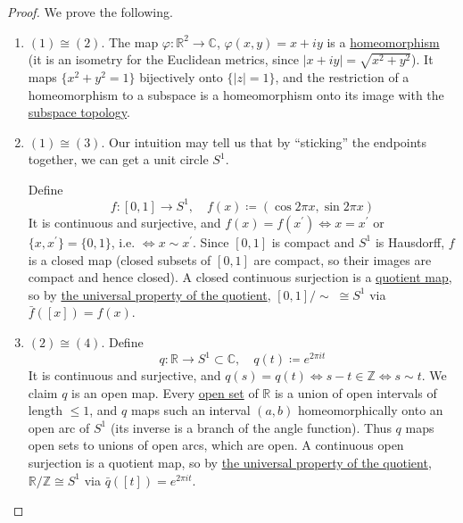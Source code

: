 	\begin{proof}
	  We prove the following. 
		\begin{enumerate}
		  \item $(1) \cong (2)$. The map $\varphi: \mathbb{R}^2 \rightarrow \mathbb{C}$, $\varphi(x, y) = x + iy$ is a \hyperref[def:homeomorphism]{homeomorphism} (it is an isometry for the Euclidean metrics, since $|x + iy| = \sqrt{x^2 + y^2}$). It maps $\{x^2 + y^2 = 1\}$ bijectively onto $\{|z| = 1\}$, and the restriction of a homeomorphism to a subspace is a homeomorphism onto its image with the \hyperref[def:subspace-topology]{subspace topology}. 

			\item $(1) \cong (3)$. Our intuition may tell us that by ``sticking'' the endpoints together, we can get a unit circle $S^1$. 

				Define 
				\begin{equation}
					f: [0, 1] \rightarrow S^1, \quad f(x) \coloneqq (\cos{2 \pi x}, \sin{2\pi x})
				\end{equation} 
				It is continuous and surjective, and $f(x) = f(x^\prime) \iff x = x^\prime$ or $\{x, x^\prime\} = \{0, 1\}$, i.e. $\iff x \sim x^\prime$. Since $[0, 1]$ is compact and $S^1$ is Hausdorff, $f$ is a closed map (closed subsets of $[0, 1]$ are compact, so their images are compact and hence closed). A closed continuous surjection is a \hyperref[def:quotient-map]{quotient map}, so by \hyperref[thm:quotient_homeomorphism]{the universal property of the quotient}, $[0, 1]/{\sim} \; \cong S^1$ via $\bar{f}([x]) = f(x)$. 

			\item $(2) \cong (4)$. Define 
				\begin{equation}
					q: \mathbb{R} \rightarrow S^1 \subset \mathbb{C}, \quad q(t) \coloneqq e^{2 \pi i t}
				\end{equation}
				It is continuous and surjective, and $q(s) = q(t) \iff s - t \in \mathbb{Z} \iff s \sim t$. We claim $q$ is an open map. Every \hyperref[def:open-set]{open set} of $\mathbb{R}$ is a union of open intervals of length $\leq 1$, and $q$ maps such an interval $(a, b)$ homeomorphically onto an open arc of $S^1$ (its inverse is a branch of the angle function). Thus $q$ maps open sets to unions of open arcs, which are open. A continuous open surjection is a quotient map, so by \hyperref[thm:quotient_homeomorphism]{the universal property of the quotient}, $\mathbb{R}/\mathbb{Z} \cong S^1$ via $\bar{q}([t]) = e^{2 \pi i t}$. 
		\end{enumerate}


\end{proof}
